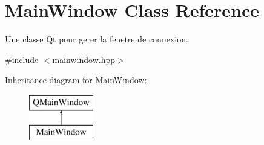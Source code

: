 \hypertarget{classMainWindow}{}\section{Main\+Window Class Reference}
\label{classMainWindow}


Une classe Qt pour gerer la fenetre de connexion.  




{\ttfamily \#include $<$mainwindow.\+hpp$>$}

Inheritance diagram for Main\+Window\+:\begin{figure}[H]
\begin{center}
\leavevmode
\includegraphics[height=2.000000cm]{classMainWindow}
\end{center}
\end{figure}
